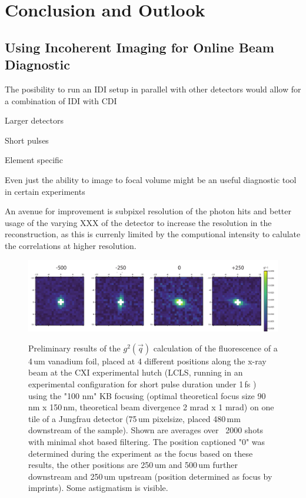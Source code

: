 \chapter{Conclusion and Outlook}


\section{Using Incoherent Imaging for Online Beam Diagnostic}



The posibility to run an IDI setup in parallel with other detectors would allow for a combination of IDI with CDI

Larger detectors

Short pulses

Element specific 


Even just the ability to image to focal volume might be an useful diagnostic tool in certain experiments


An avenue for improvement is subpixel resolution of the photon hits and better usage of the varying XXX of the detector to increase the resolution in the reconstruction, as this is currenly limited by the computional intensity to calulate the correlations at higher resolution.


\begin{figure}
	\centering
	\includegraphics[width=\linewidth]{images/lv65_vanadium.pdf}
	\label{fig:outlook_vanadium}
	\caption[Focus finding using IDI]{Preliminary results of the $g^2(\vec{q})$ calculation of the fluorescence of a 4\,um vanadium foil, placed at 4 different positions along the x-ray beam at the CXI experimental hutch (LCLS, running in an experimental configuration for short pulse duration under 1\,fs \cite{argosecond}) using the "100 nm" KB focusing (optimal theoretical focus size 90\,nm x 150\,nm, theoretical beam divergence 2 mrad x 1 mrad) on one tile of a Jungfrau detector (75\,um pixelsize, placed 480\,mm downstream of the sample). Shown are averages over ~2000 shots with minimal shot based filtering. The position captioned "0" was determined during the experiment as the focus based on these results, the other positions are 250\,um and 500\,um further downstream and 250\,um upstream (position determined as focus by imprints).  Some astigmatism is visible.}
\end{figure}


